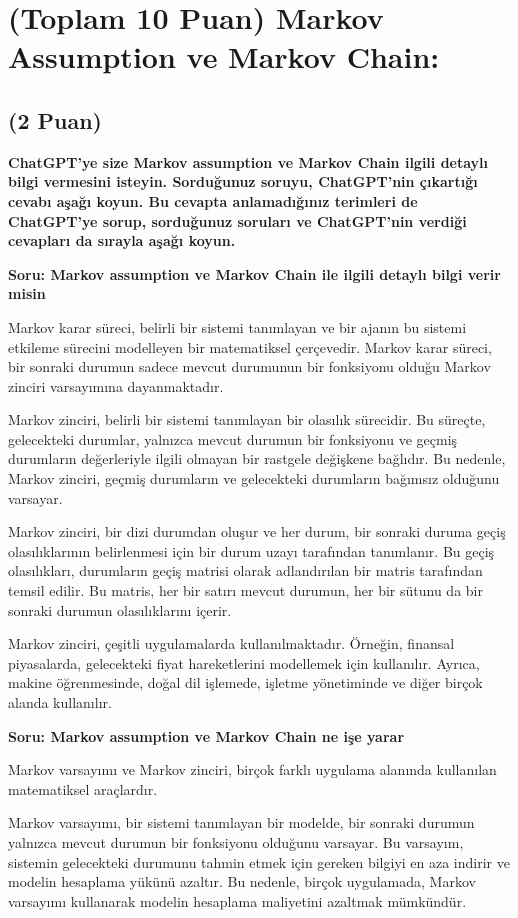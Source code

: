 \documentclass[11pt]{article}
\begin{document}
\section{(Toplam 10 Puan) Markov Assumption ve Markov Chain:}

\subsection{(2 Puan)} \textbf{ChatGPT’ye size Markov assumption ve Markov Chain ilgili detaylı bilgi vermesini isteyin. Sorduğunuz soruyu, ChatGPT'nin çıkartığı cevabı aşağı koyun. Bu cevapta anlamadığınız terimleri de ChatGPT’ye sorup, sorduğunuz soruları ve ChatGPT’nin verdiği cevapları da sırayla aşağı koyun.}

\textbf{Soru: Markov assumption ve Markov Chain ile ilgili detaylı bilgi verir misin}

Markov karar süreci, belirli bir sistemi tanımlayan ve bir ajanın bu sistemi etkileme sürecini modelleyen bir matematiksel çerçevedir. Markov karar süreci, bir sonraki durumun sadece mevcut durumunun bir fonksiyonu olduğu Markov zinciri varsayımına dayanmaktadır.

Markov zinciri, belirli bir sistemi tanımlayan bir olasılık sürecidir. Bu süreçte, gelecekteki durumlar, yalnızca mevcut durumun bir fonksiyonu ve geçmiş durumların değerleriyle ilgili olmayan bir rastgele değişkene bağlıdır. Bu nedenle, Markov zinciri, geçmiş durumların ve gelecekteki durumların bağımsız olduğunu varsayar.

Markov zinciri, bir dizi durumdan oluşur ve her durum, bir sonraki duruma geçiş olasılıklarının belirlenmesi için bir durum uzayı tarafından tanımlanır. Bu geçiş olasılıkları, durumların geçiş matrisi olarak adlandırılan bir matris tarafından temsil edilir. Bu matris, her bir satırı mevcut durumun, her bir sütunu da bir sonraki durumun olasılıklarını içerir.

Markov zinciri, çeşitli uygulamalarda kullanılmaktadır. Örneğin, finansal piyasalarda, gelecekteki fiyat hareketlerini modellemek için kullanılır. Ayrıca, makine öğrenmesinde, doğal dil işlemede, işletme yönetiminde ve diğer birçok alanda kullanılır.

\textbf{Soru: Markov assumption ve Markov Chain ne işe yarar}

Markov varsayımı ve Markov zinciri, birçok farklı uygulama alanında kullanılan matematiksel araçlardır.

Markov varsayımı, bir sistemi tanımlayan bir modelde, bir sonraki durumun yalnızca mevcut durumun bir fonksiyonu olduğunu varsayar. Bu varsayım, sistemin gelecekteki durumunu tahmin etmek için gereken bilgiyi en aza indirir ve modelin hesaplama yükünü azaltır. Bu nedenle, birçok uygulamada, Markov varsayımı kullanarak modelin hesaplama maliyetini azaltmak mümkündür.
\end{document}
